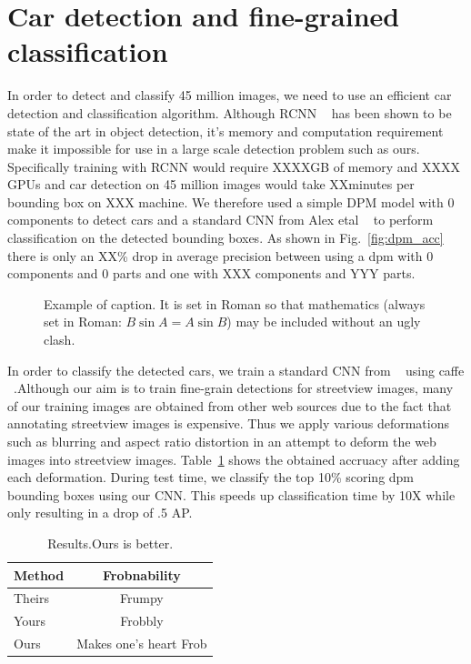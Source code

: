 \documentclass[10pt,twocolumn,letterpaper]{article}
\begin{document}
\section{Car detection and fine-grained classification}
In order to detect and classify 45 million images, we need to use an efficient car detection and classification algorithm. Although RCNN ~\cite{rcnn} has been shown to be state of the art in object detection, it's memory and computation requirement make it impossible for use in a large scale detection problem such as ours. Specifically training with RCNN  would require XXXXGB of memory and XXXX GPUs and car detection on 45 million images would take XXminutes per bounding box on XXX machine. We therefore used a simple DPM model with 0 components to detect cars and a standard CNN from Alex etal ~\cite{alexnet} to perform classification on the detected bounding boxes. As shown in Fig.~\ref{fig:dpm_acc} there is only an XX\% drop in average precision between using a dpm with 0 components and 0 parts and one with XXX components and YYY parts.

\begin{figure}[t]
\begin{center}
\fbox{\rule{0pt}{2in} \rule{0.9\linewidth}{0pt}}
\end{center}
   \caption{Example of caption.  It is set in Roman so that mathematics
   (always set in Roman: $B \sin A = A \sin B$) may be included without an
   ugly clash.}
\label{fig:dataset5}
\end{figure}

In order to classify the detected cars, we train a standard CNN from ~\cite{alexnet} using caffe ~\cite{caffe}.Although our aim is to train fine-grain detections for streetview images, many of our training images are obtained from other web sources due to the fact that annotating streetview images is expensive. Thus we apply various deformations such as blurring and aspect ratio distortion in an attempt to deform the web images into streetview images. Table~\ref{table:acc-deformation} shows the obtained accruacy after adding each deformation. During test time, we classify the top 10\% scoring dpm bounding boxes using our CNN. This speeds up classification time by 10X while only resulting in a drop of .5 AP. 

\begin{table}
\begin{center}
\begin{tabular}{|l|c|}
\hline
Method & Frobnability \\
\hline\hline
Theirs & Frumpy \\
Yours & Frobbly \\
Ours & Makes one's heart Frob\\
\hline
\end{tabular}
\end{center}
\caption{Results.Ours is better.}
\label{table:acc-deformation}
\end{table}
\end{document}
